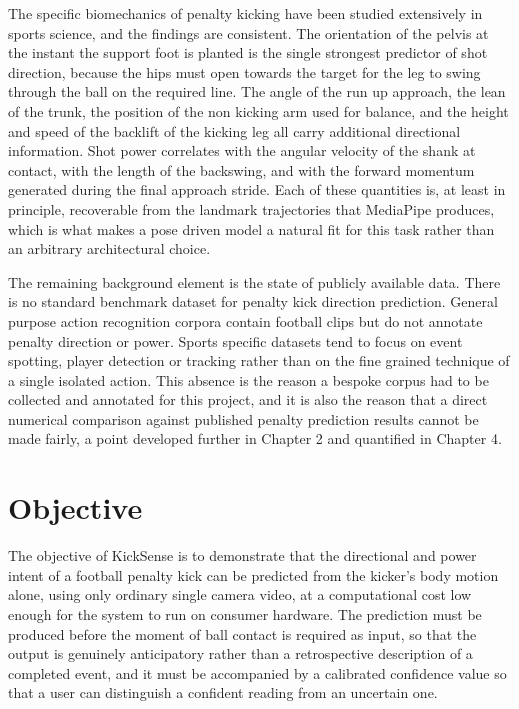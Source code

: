 The specific biomechanics of penalty kicking have been studied extensively in sports science, and the findings are consistent. The orientation of the pelvis at the instant the support foot is planted is the single strongest predictor of shot direction, because the hips must open towards the target for the leg to swing through the ball on the required line. The angle of the run up approach, the lean of the trunk, the position of the non kicking arm used for balance, and the height and speed of the backlift of the kicking leg all carry additional directional information. Shot power correlates with the angular velocity of the shank at contact, with the length of the backswing, and with the forward momentum generated during the final approach stride. Each of these quantities is, at least in principle, recoverable from the landmark trajectories that MediaPipe produces, which is what makes a pose driven model a natural fit for this task rather than an arbitrary architectural choice.

The remaining background element is the state of publicly available data. There is no standard benchmark dataset for penalty kick direction prediction. General purpose action recognition corpora contain football clips but do not annotate penalty direction or power. Sports specific datasets tend to focus on event spotting, player detection or tracking rather than on the fine grained technique of a single isolated action. This absence is the reason a bespoke corpus had to be collected and annotated for this project, and it is also the reason that a direct numerical comparison against published penalty prediction results cannot be made fairly, a point developed further in Chapter 2 and quantified in Chapter 4.

\section{Objective}

The objective of KickSense is to demonstrate that the directional and power intent of a football penalty kick can be predicted from the kicker's body motion alone, using only ordinary single camera video, at a computational cost low enough for the system to run on consumer hardware. The prediction must be produced before the moment of ball contact is required as input, so that the output is genuinely anticipatory rather than a retrospective description of a completed event, and it must be accompanied by a calibrated confidence value so that a user can distinguish a confident reading from an uncertain one.

